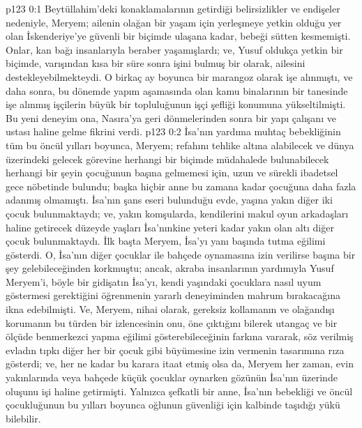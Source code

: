 \vs p123 0:1 Beytüllahim’deki konaklamalarının getirdiği belirsizlikler ve endişeler nedeniyle, Meryem; ailenin olağan bir yaşam için yerleşmeye yetkin olduğu yer olan İskenderiye’ye güvenli bir biçimde ulaşana kadar, bebeği sütten kesmemişti. Onlar, kan bağı insanlarıyla beraber yaşamışlardı; ve, Yusuf oldukça yetkin bir biçimde, varışından kısa bir süre sonra işini bulmuş bir olarak, ailesini destekleyebilmekteydi. O birkaç ay boyunca bir marangoz olarak işe alınmıştı, ve daha sonra, bu dönemde yapım aşamasında olan kamu binalarının bir tanesinde işe alınmış işçilerin büyük bir topluluğunun işçi şefliği konumuna yükseltilmişti. Bu yeni deneyim ona, Nasıra’ya geri dönmelerinden sonra bir yapı çalışanı ve ustası haline gelme fikrini verdi.
\vs p123 0:2 İsa’nın yardıma muhtaç bebekliğinin tüm bu öncül yılları boyunca, Meryem; refahını tehlike altına alabilecek ve dünya üzerindeki gelecek görevine herhangi bir biçimde müdahalede bulunabilecek herhangi bir şeyin çocuğunun başına gelmemesi için, uzun ve sürekli ibadetsel gece nöbetinde bulundu; başka hiçbir anne bu zamana kadar çocuğuna daha fazla adanmış olmamıştı. İsa’nın şans eseri bulunduğu evde, yaşına yakın diğer iki çocuk bulunmaktaydı; ve, yakın komşularda, kendilerini makul oyun arkadaşları haline getirecek düzeyde yaşları İsa’nınkine yeteri kadar yakın olan altı diğer çocuk bulunmaktaydı. İlk başta Meryem, İsa’yı yanı başında tutma eğilimi gösterdi. O, İsa’nın diğer çocuklar ile bahçede oynamasına izin verilirse başına bir şey gelebileceğinden korkmuştu; ancak, akraba insanlarının yardımıyla Yusuf Meryem’i, böyle bir gidişatın İsa’yı, kendi yaşındaki çocuklara nasıl uyum göstermesi gerektiğini öğrenmenin yararlı deneyiminden mahrum bırakacağına ikna edebilmişti. Ve, Meryem, nihai olarak, gereksiz kollamanın ve olağandışı korumanın bu türden bir izlencesinin onu, öne çıktığını bilerek utangaç ve bir ölçüde benmerkezci yapma eğilimi gösterebileceğinin farkına vararak, söz verilmiş evladın tıpkı diğer her bir çocuk gibi büyümesine izin vermenin tasarımına rıza gösterdi; ve, her ne kadar bu karara itaat etmiş olsa da, Meryem her zaman, evin yakınlarında veya bahçede küçük çocuklar oynarken gözünün İsa’nın üzerinde oluşunu işi haline getirmişti. Yalnızca şefkatli bir anne, İsa’nın bebekliği ve öncül çocukluğunun bu yılları boyunca oğlunun güvenliği için kalbinde taşıdığı yükü bilebilir.
